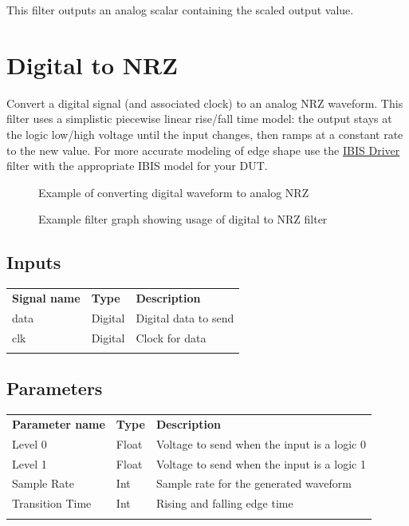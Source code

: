 This filter outputs an analog scalar containing the scaled output value.

\pagebreak
\section{Digital to NRZ}
\label{filter:digitaltonrz}

Convert a digital signal (and associated clock) to an analog NRZ waveform. This filter uses a simplistic piecewise
linear rise/fall time model: the output stays at the logic low/high voltage until the input changes, then ramps at a
constant rate to the new value. For more accurate modeling of edge shape use the \hyperref[filter:ibisdriver]{IBIS
Driver} filter with the appropriate IBIS model for your DUT.

\begin{figure}[h]
\centering
{}
\caption{Example of converting digital waveform to analog NRZ}
\label{filter_digital_to_nrz}
\end{figure}

\begin{figure}[h]
\centering
{}
\caption{Example filter graph showing usage of digital to NRZ filter}
\label{filter_digital_to_nrz_graph}
\end{figure}

\FloatBarrier

\subsection{Inputs}

\begin{tabularx}{16cm}{llX}
\thickhline
\textbf{Signal name} & \textbf{Type} & \textbf{Description} \\
\thickhline
data & Digital & Digital data to send\\
\thinhline
clk & Digital & Clock for data\\
\thickhline
\end{tabularx}

\subsection{Parameters}

\begin{tabularx}{16cm}{llX}
\thickhline
\textbf{Parameter name} & \textbf{Type} & \textbf{Description} \\
\thickhline
Level 0 & Float & Voltage to send when the input is a logic 0\\
\thinhline
Level 1 & Float & Voltage to send when the input is a logic 1\\
\thinhline
Sample Rate & Int & Sample rate for the generated waveform\\
\thinhline
Transition Time & Int & Rising and falling edge time\\
\thickhline
\end{tabularx}


